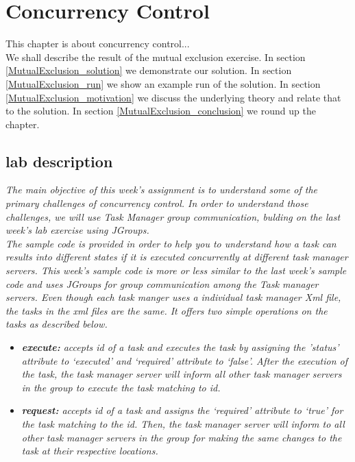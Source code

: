 \chapter{Concurrency Control}
\minitoc

This chapter is about concurrency control...  \\

We shall describe the result of the mutual exclusion exercise. In section \ref{MutualExclusion_solution} we demonstrate our solution. In section \ref{MutualExclusion_run} we show an example run of the solution. In section \ref{MutualExclusion_motivation} we discuss the underlying theory and relate that to the solution. In section \ref{MutualExclusion_conclusion} we round up the chapter.

\section{lab description}
\textit{The main objective of this week’s assignment is to understand some of the primary challenges of concurrency control. In order to understand those challenges, we will use Task Manager group communication, bulding on the last week’s lab exercise using JGroups.}\\

\textit{The sample code is provided in order to help you to understand how a task can results into different states if it is executed concurrently at different task manager servers. This week’s sample code is more or less similar to the last week’s sample code and uses JGroups for group communication among the Task manager servers. Even though each task manger uses a individual task manager Xml file, the tasks in the xml files are the same. It offers two simple operations on the tasks as described below.}

\begin{itemize}
\item \textit{\textbf{execute:} accepts id of a task and executes the task by assigning the ’status’ attribute to ‘executed’ and ‘required’ attribute to ‘false’. After the execution of the task, the task manager server will inform all other task manager servers in the group to execute the task matching to id.}
\item \textit{\textbf{request:} accepts id of a task and assigns the ‘required’ attribute to ‘true’ for the task matching to the id. Then, the task manager server will inform to all other task manager servers in the group for making the same changes to the task at their respective locations.}
\end{itemize}

